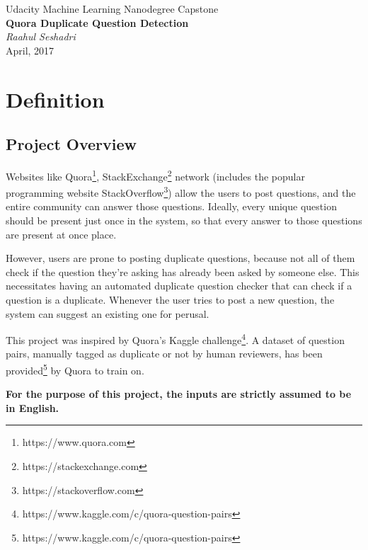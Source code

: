 \documentclass{article}
\begin{document}
\begin{titlepage}
    \begin{center}
        \Large{Udacity Machine Learning Nanodegree Capstone}\\
        \LARGE\textbf{Quora Duplicate Question Detection}\\
        \vspace{1cm}
        \large\textit{Raahul Seshadri}\\
        \normalsize{April, 2017}
    \end{center}
\end{titlepage}

\tableofcontents
\newpage

\section{Definition}

\subsection{Project Overview}
Websites like Quora\footnote{https://www.quora.com}, StackExchange\footnote{https://stackexchange.com} network (includes the popular programming website StackOverflow\footnote{https://stackoverflow.com}) allow the users to post questions, and the entire community can answer those questions. Ideally, every unique question should be present just once in the system, so that every answer to those questions are present at once place.

However, users are prone to posting duplicate questions, because not all of them check if the question they're asking has already been asked by someone else. This necessitates having an automated duplicate question checker that can check if a question is a duplicate. Whenever the user tries to post a new question, the system can suggest an existing one for perusal.

This project was inspired by Quora's Kaggle challenge\footnote{https://www.kaggle.com/c/quora-question-pairs}. A dataset of question pairs, manually tagged as duplicate or not by human reviewers, has been provided\footnote{https://www.kaggle.com/c/quora-question-pairs} by Quora to train on.

\textbf{For the purpose of this project, the inputs are strictly assumed to be in English.}
\end{document}
